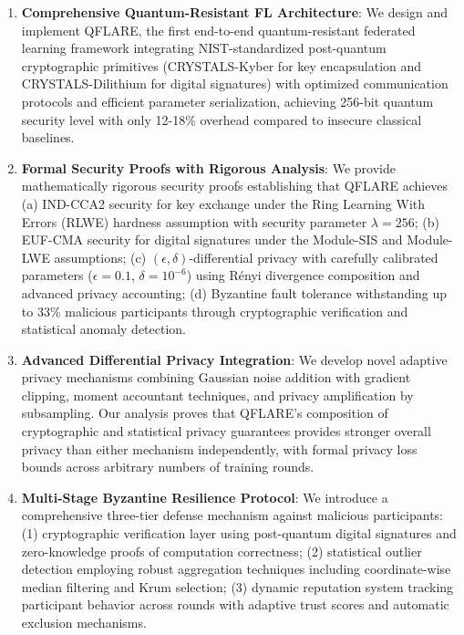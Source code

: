 \documentclass[journal,onecolumn]{IEEEtran}
\begin{document}
\begin{enumerate}
\item \textbf{Comprehensive Quantum-Resistant FL Architecture}: We design and implement QFLARE, the first end-to-end quantum-resistant federated learning framework integrating NIST-standardized post-quantum cryptographic primitives (CRYSTALS-Kyber for key encapsulation and CRYSTALS-Dilithium for digital signatures) with optimized communication protocols and efficient parameter serialization, achieving 256-bit quantum security level with only 12-18\% overhead compared to insecure classical baselines.

\item \textbf{Formal Security Proofs with Rigorous Analysis}: We provide mathematically rigorous security proofs establishing that QFLARE achieves (a) IND-CCA2 security for key exchange under the Ring Learning With Errors (RLWE) hardness assumption with security parameter $\lambda = 256$; (b) EUF-CMA security for digital signatures under the Module-SIS and Module-LWE assumptions; (c) $(\epsilon, \delta)$-differential privacy with carefully calibrated parameters ($\epsilon = 0.1$, $\delta = 10^{-6}$) using Rényi divergence composition and advanced privacy accounting; (d) Byzantine fault tolerance withstanding up to 33\% malicious participants through cryptographic verification and statistical anomaly detection.

\item \textbf{Advanced Differential Privacy Integration}: We develop novel adaptive privacy mechanisms combining Gaussian noise addition with gradient clipping, moment accountant techniques, and privacy amplification by subsampling. Our analysis proves that QFLARE's composition of cryptographic and statistical privacy guarantees provides stronger overall privacy than either mechanism independently, with formal privacy loss bounds across arbitrary numbers of training rounds.

\item \textbf{Multi-Stage Byzantine Resilience Protocol}: We introduce a comprehensive three-tier defense mechanism against malicious participants: (1) cryptographic verification layer using post-quantum digital signatures and zero-knowledge proofs of computation correctness; (2) statistical outlier detection employing robust aggregation techniques including coordinate-wise median filtering and Krum selection; (3) dynamic reputation system tracking participant behavior across rounds with adaptive trust scores and automatic exclusion mechanisms.


\end{enumerate}
\end{document}
